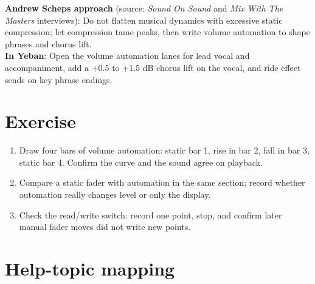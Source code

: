 \begin{tipbox}
\textbf{Andrew Scheps approach} (source: \emph{Sound On Sound} and \emph{Mix With The Masters} interviews): Do not flatten musical dynamics with excessive static compression; let compression tame peaks, then write volume automation to shape phrases and chorus lift.\\
\textbf{In Yeban}: Open the volume automation lanes for lead vocal and accompaniment, add a +0.5 to +1.5 dB chorus lift on the vocal, and ride effect sends on key phrase endings.
\end{tipbox}

\section{Exercise}


\begin{exercise}
\begin{enumerate}
  \item Draw four bars of volume automation: static bar 1, rise in bar 2, fall in bar 3, static bar 4. Confirm the curve and the sound agree on playback.
  \item Compare a static fader with automation in the same section; record whether automation really changes level or only the display.
  \item Check the read/write switch: record one point, stop, and confirm later manual fader moves did not write new points.
\end{enumerate}
\end{exercise}

\section{Help-topic mapping}

